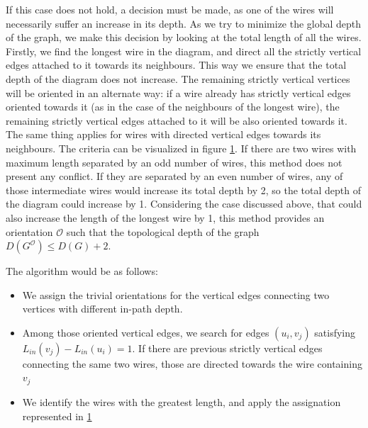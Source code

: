 \documentclass[12pt, twoside, openany]{book}
\begin{document}
If this case does not hold, a decision must be made, as one of the wires will necessarily suffer an increase in its depth. As we try to minimize the global depth of the graph, we make this decision by looking at the total length of all the wires. Firstly, we find the longest wire in the diagram, and direct all the strictly vertical edges attached to it towards its neighbours. This way we ensure that the total depth of the diagram does not increase. The remaining strictly vertical vertices will be oriented in an alternate way: if a wire already has strictly vertical edges oriented towards it (as in the case of the neighbours of the longest wire), the remaining strictly vertical edges attached to it will be also oriented towards it. The same thing applies for wires with directed vertical edges towards its neighbours. The criteria can be visualized in figure \ref{fig:orientation_assignation}. If there are two wires with maximum length separated by an odd number of wires, this method does not present any conflict. If they are separated by an even number of wires, any of those intermediate wires would increase its total depth by 2, so the total depth of the diagram could increase by 1. Considering the case discussed above, that could also increase the length of the longest wire by 1, this method provides an orientation $\mathcal{O}$ such that the topological depth of the graph $D(G^\mathcal{O}) \leq D(G) + 2$.\\

\begin{figure} [ht]
    \centering
    
    \caption{}
    \label{fig:orientation_assignation}
\end{figure}

The algorithm would be as follows:

\begin{itemize}
    \item We assign the trivial orientations for the vertical edges connecting two vertices with different in-path depth.
    \item Among those oriented vertical edges, we search for edges $(u_i, v_j)$ satisfying $L_{in}(v_j) - L_{in}(u_i) = 1$. If there are previous strictly vertical edges connecting the same two wires, those are directed towards the wire containing $v_j$
    \item We identify the wires with the greatest length, and apply the assignation represented in \ref{fig:orientation_assignation}
\end{itemize}
\end{document}
